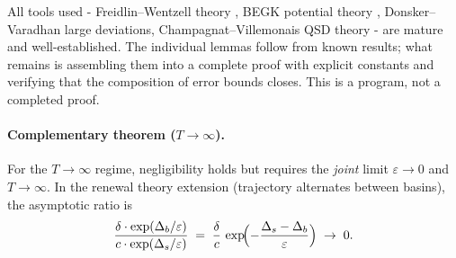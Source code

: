 \documentclass[12pt]{article}
\theoremstyle{remark}
\begin{document}
All tools used - Freidlin--Wentzell theory \cite{freidlin-wentzell2012}, BEGK potential theory \cite{bovier2004}, Donsker--Varadhan large deviations, Champagnat--Villemonais QSD theory - are mature and well-established. The individual lemmas follow from known results; what remains is assembling them into a complete proof with explicit constants and verifying that the composition of error bounds closes. This is a program, not a completed proof.

\paragraph{Complementary theorem ($T \to \infty$).}
For the $T \to \infty$ regime, negligibility holds but requires the \emph{joint} limit $\varepsilon \to 0$ and $T \to \infty$. In the renewal theory extension (trajectory alternates between basins), the asymptotic ratio is
\[
  \frac{\delta \cdot \exp(\Delta_b/\varepsilon)}{c \cdot \exp(\Delta_s/\varepsilon)} \;=\; \frac{\delta}{c}\, \exp\!\Bigl(-\frac{\Delta_s - \Delta_b}{\varepsilon}\Bigr) \;\to\; 0.
\]
\end{document}
